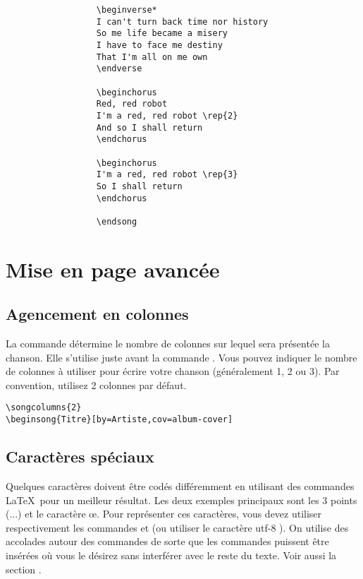 \documentclass[versionenligne]{patacrep}
\begin{document}
\begin{verbatim}
                  \beginverse*
                  I can't turn back time nor history
                  So me life became a misery
                  I have to face me destiny
                  That I'm all on me own
                  \endverse

                  \beginchorus
                  Red, red robot
                  I'm a red, red robot \rep{2}
                  And so I shall return
                  \endchorus

                  \beginchorus
                  I'm a red, red robot \rep{3}
                  So I shall return
                  \endchorus

                  \endsong
\end{verbatim}

\section{Mise en page avancée}

\subsection{Agencement en colonnes}

La commande  détermine le nombre de colonnes sur
lequel sera présentée la chanson. Elle s'utilise juste avant la
commande . Vous pouvez indiquer le nombre de colonnes
à utiliser pour écrire votre chanson (généralement 1, 2 ou 3). Par
convention, utilisez 2 colonnes par défaut.

\begin{verbatim}
\songcolumns{2}
\beginsong{Titre}[by=Artiste,cov=album-cover]
\end{verbatim}

\subsection{Caractères spéciaux}

Quelques caractères doivent être codés différemment en utilisant des
commandes \LaTeX\, pour un meilleur résultat. Les deux exemples
principaux sont les 3 points (...) et le caractère \oe{}. Pour
représenter ces caractères, vous devez utiliser respectivement les
commandes  et  (ou utiliser le
caractère utf-8 ). On utilise des accolades autour des commandes de
sorte que les commandes puissent être insérées où vous le désirez sans
interférer avec le reste du texte. Voir aussi
la section .
\end{document}
